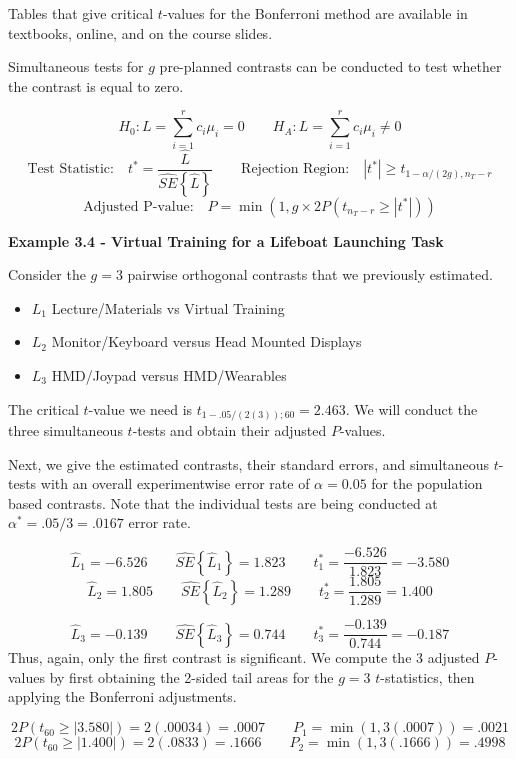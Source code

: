 \documentclass[
]{book}
\providecommand{\tightlist}{%
  \setlength{\itemsep}{0pt}\setlength{\parskip}{0pt}}
\begin{document}
Tables that give critical \(t\)-values for the Bonferroni method are
available in textbooks, online, and on the course slides.

Simultaneous tests for \(g\) pre-planned contrasts can be conducted to
test whether the contrast is equal to zero.

\[
H_0:L=\sum_{i=1}^rc_i\mu_i=0 \qquad H_A:L=\sum_{i=1}^rc_i\mu_i \ne 0
\] \[
\mbox{Test Statistic:} \quad t^*=\frac{\hat{L}}{\hat{SE}\left\{\hat{L}\right\}}
\qquad \mbox{Rejection Region:} \quad \left|t^*\right| \ge t_{1-\alpha/(2g),n_T-r}
\] \[
\mbox{Adjusted P-value:} \quad P=\min\left(1,g\times 2P\left(t_{n_T-r}\ge \left|t^*\right|\right)\right)
\]

\textbf{Example 3.4 - Virtual Training for a Lifeboat Launching Task}

Consider the \(g=3\) pairwise orthogonal contrasts that we previously
estimated.

\begin{itemize}
\tightlist
\item
  \(L_1\) Lecture/Materials vs Virtual Training
\item
  \(L_2\) Monitor/Keyboard versus Head Mounted Displays
\item
  \(L_3\) HMD/Joypad versus HMD/Wearables
\end{itemize}

The critical \(t\)-value we need is \(t_{1-.05/(2(3));60}=2.463\). We
will conduct the three simultaneous \(t\)-tests and obtain their
adjusted \(P\)-values.

Next, we give the estimated contrasts, their standard errors, and
simultaneous \(t\)-tests with an overall experimentwise error rate of
\(\alpha=0.05\) for the population based contrasts. Note that the
individual tests are being conducted at \(\alpha^*=.05/3=.0167\) error
rate.

\[
\hat{L}_1=-6.526 \qquad \hat{SE}\left\{\hat{L}_1\right\}=1.823 \qquad t_1^*=\frac{-6.526}{1.823}=-3.580
\] \[
\hat{L}_2=1.805 \qquad \hat{SE}\left\{\hat{L}_2\right\}=1.289 \qquad t_2^*=\frac{1.805}{1.289}=1.400
\]

\[
\hat{L}_3=-0.139 \qquad \hat{SE}\left\{\hat{L}_3\right\}=0.744 \qquad t_3^*=\frac{-0.139}{0.744}=-0.187
\] Thus, again, only the first contrast is significant. We compute the 3
adjusted \(P\)-values by first obtaining the 2-sided tail areas for the
\(g=3\) \(t\)-statistics, then applying the Bonferroni adjustments.

\[
2P\left(t_{60}\ge|3.580|\right) = 2(.00034)=.0007
\qquad P_1 = \min\left(1,3(.0007)\right) = .0021
\] \[
2P\left(t_{60}\ge|1.400|\right) = 2(.0833)=.1666
\qquad
P_2 = \min\left(1,3(.1666)\right) = .4998
\]
\end{document}
